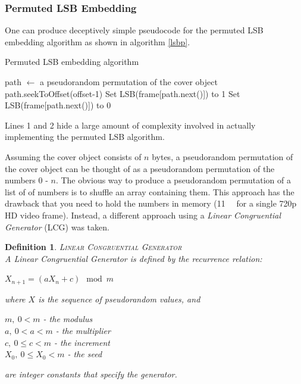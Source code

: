 \documentclass[paper=a4, fontsize=11pt,twoside]{scrartcl}    %
\numberwithin{table}{section}
\numberwithin{figure}{section}
\numberwithin{algorithm}{section}
\newtheorem{ddef}{Definition}[section]
\begin{document}
\subsubsection{Permuted LSB Embedding}

One can produce deceptively simple pseudocode for the permuted LSB embedding algorithm as shown in algorithm \ref{lsbp}.

\begin{algorithm}[!h]
\caption{Permuted LSB embedding algorithm}
\label{lsbp}
\begin{algorithmic}[1]
\State path $\gets$ a pseudorandom permutation of the cover object
\State path.seekToOffset(offset-1)
			\State Set LSB(frame[path.next()]) to 1
		\Else
			\State Set LSB(frame[path.next()]) to 0
		\EndIf
	\EndFor
\EndFor
\end{algorithmic}
\end{algorithm}

\noindent
Lines 1 and 2 hide a large amount of complexity involved in actually implementing the permuted LSB algorithm.

Assuming the cover object consists of $n$ bytes, a pseudorandom permutation of the cover object can be thought of as a pseudorandom permutation of the numbers 0 - $n$. The obvious way to produce a pseudorandom permutation of a list of of numbers is to shuffle an array containing them. This approach has the drawback that you need to hold the numbers in memory (\SI{11}{\mega\byte} for a single 720p HD video frame). Instead, a different approach using a \textit{Linear Congruential Generator} (LCG) was taken.

\begin{ddef}
\textsc{Linear Congruential Generator}\\[5pt]
A Linear Congruential Generator is defined by the recurrence relation:
\begin{center}
$X_{n+1} = (aX_{n} + c) \mod m$
\end{center}
where $X$ is the sequence of pseudorandom values, and
\begin{center}
$m, ~0 < m$ - the modulus\\
$a, ~0 < a < m$ - the multiplier\\
$c, ~0 \leq c < m$ - the increment\\
$X_{0}, ~0 \leq X_{0} < m$ - the seed
\end{center}
are integer constants that specify the generator.
\end{ddef}
\end{document}
